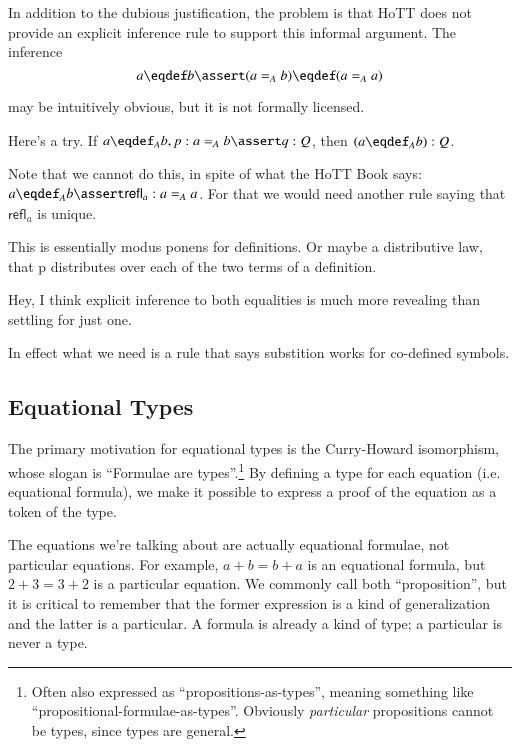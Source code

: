 In addition to the dubious justification, the problem is that HoTT
does not provide an explicit inference rule to support this informal
argument. The inference
\[a\defeq b \linfer (a=_A b) \defeq (a=_A a)\]

may be intuitively obvious, but it is not formally licensed.

Here's a try. If \(a\defeq_A b, p:a=_A b \linfer q:Q\), then \((a\defeq_A b):Q\).


Note that we cannot do this, in spite of what the HoTT Book says:
\mbox{\(a\defeq_A b\linfer\textsf{refl}_a:a=_A a\)}. For that we would
need another rule saying that \(\textsf{refl}_a\) is unique.

This is essentially modus ponens for definitions. Or maybe a
distributive law, that p distributes over each of the two terms of a
definition.

Hey, I think explicit inference to both equalities is much more
revealing than settling for just one.

In effect what we need is a rule that says substition works for
co-defined symbols.

\subsection{Equational Types}

The primary motivation for equational types is the Curry-Howard
isomorphism, whose slogan is ``Formulae are types''.\footnote{Often
also expressed as ``propositions-as-types'', meaning something like
``propositional-formulae-as-types''. Obviously \textit{particular}
propositions cannot be types, since types are general.} By defining a
type for each equation (i.e. equational formula), we make it possible
to express a proof of the equation as a token of the type.

The equations we're talking about are actually equational formulae,
not particular equations. For example, \(a+b=b+a\) is an equational
formula, but \(2+3=3+2\) is a particular equation. We commonly call
both ``proposition'', but it is critical to remember that the former
expression is a kind of generalization and the latter is a particular.
A formula is already a kind of type; a particular is never a type.


